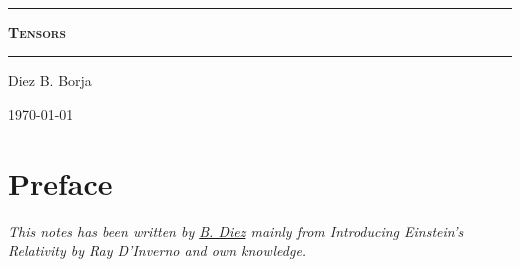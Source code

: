 \documentclass[letterpaper, onecolumn, 11pt]{book}
\begin{document}
\sffamily
\begin{center}

\

\vspace{6.5cm}

\rule{15cm}{0.1cm}

\vspace{1.5cm}

{\huge \textsc{\textbf{Tensors}}}

\vspace{1.5cm}

\rule{15cm}{0.1cm}

\vspace{1.5cm}
Diez B. Borja


\today

\newpage
\setcounter{page}{1}

\pagestyle{plain}
\chapter*{Preface}
\bigskip
\bigskip
\bigskip
\bigskip
\bigskip
\bigskip


\emph{This notes has been written by \href{https://github.com/10BlackHole}{B. Diez} mainly from Introducing Einstein's Relativity by Ray D'Inverno and own knowledge.}

\end{center}
\tableofcontents
{}
\setcounter{page}{1}


\end{document}

